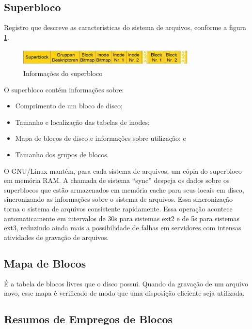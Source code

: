 \subsection{Superbloco}

Registro que descreve as características do sistema de arquivos, conforme a figura \ref{fig:superbloco}.

\begin{figure}
	\centering
	\includegraphics[width=0.8\textwidth]{sistemas_de_arquivos/fig/superbloco.jpg}
	\caption{Informações do superbloco}
	\label{fig:superbloco}
\end{figure}

O superbloco contém informações sobre:

\begin{itemize}
	\item Comprimento de um bloco de disco;
	\item Tamanho e localização das tabelas de inodes;
	\item Mapa de blocos de disco e informações sobre utilização; e
	\item Tamanho dos grupos de blocos.
\end{itemize}

O GNU/Linux mantém, para cada sistema de arquivos, um cópia do superbloco em memória RAM. A chamada de sistema ``sync'' despeja os dados sobre os superblocos que estão armazenados em memória cache para seus locais em disco, sincronizando as informações sobre o sistema de arquivos. Essa sincronização torna o sistema de arquivos consistente rapidamente. Essa operação acontece automaticamente em intervalos de 30s para sistemas ext2 e de 5s para sistemas ext3, reduzindo ainda mais a possibilidade de falhas em servidores com intensas atividades de gravação de arquivos.

\subsection{Mapa de Blocos}

É a tabela de blocos livres que o disco possui. Quando da gravação de um arquivo novo, esse mapa é verificado de modo que uma disposição eficiente seja utilizada.

\subsection{Resumos de Empregos de Blocos}

